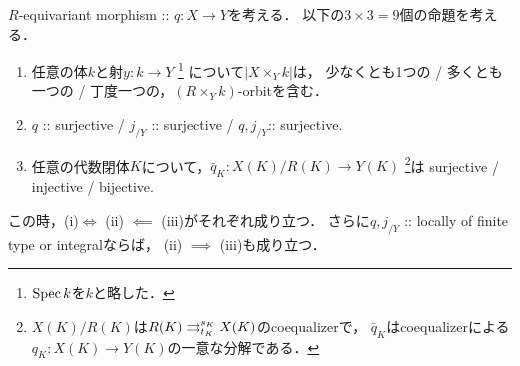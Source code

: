 \documentclass[a4paper, dvipdfmx]{jsarticle}
\begin{document}
\begin{Prop}
    $R$-equivariant morphism :: $q \colon X \to Y$を考える．
    以下の$3 \times 3=9$個の命題を考える．
    {\samepage
    \begin{enumerate}
    \item
        任意の体$k$と射$y \colon k \to Y$ \footnote{$\operatorname{Spec} k$を$k$と略した．}
            について$|X \times_{Y} k|$は，\mnewline
        少なくとも1つの / 多くとも一つの / 丁度一つの，$(R \times_{Y} k)$-orbitを含む．
    \item
        $q$ :: surjective / $j_{/Y}$ :: surjective / $q, j_{/Y}$:: surjective.
    \item
        任意の代数閉体$K$について，$\bar{q}_K \colon X(K)/R(K) \to Y(K)$
        \footnote
            {
                $X(K)/R(K)$は$R(K) \mathrel{\mathop{\rightrightarrows}^{s_K}_{t_K}} X(K)$のcoequalizerで，
                $\bar{q}_K$はcoequalizerによる$q_K \colon X(K) \to Y(K)$の一意な分解である．
            }は \mnewline
        surjective / injective / bijective.
    \end{enumerate}
    }

    この時，(i)$ \iff$ (ii) $\impliedby$ (iii)がそれぞれ成り立つ．
    さらに$q, j_{/Y}$ :: locally of finite type or integralならば，
    (ii) $\implies$ (iii)も成り立つ．
\end{Prop}
\end{document}
